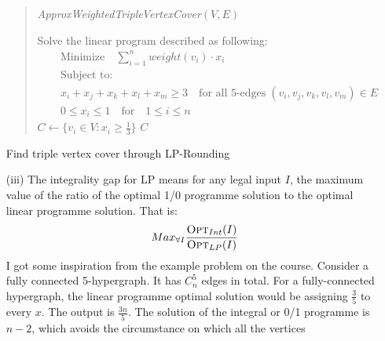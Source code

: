 \documentclass{article}
\renewcommand{\leq}{\leqslant}
\renewcommand{\geq}{\geqslant}
\newcounter{rcounter}
\newenvironment{rlist}%
{\begin{list}{\setnr-\arabic{rcounter}}{\usecounter{rcounter}}}{\end{list}}
\begin{document}
\begin{rlist}
\begin{enumerate}
            \begin{algorithm}
                \vspace*{2mm}
                \begin{quotation}
                    \noindent
                    \emph{ApproxWeightedTripleVertexCover}$(V,E)$
                    \begin{algorithmic}[1]
                        \State Solve the linear program described as following:
                        \begin{eqnarray*}
                            && \textrm{Minimize} \quad \sum_{i=1}^{n}weight(v_i) \cdot x_i \\
                            &&\textrm{Subject to:}\\
                            && x_i+x_j+x_k+x_l+x_m \geq 3 \quad \textrm{for all 5-edges} \; (v_i, v_j, v_k, v_l, v_m) \in  E\\
                            && 0 \leq x_i \leq 1 \quad \textrm{for} \quad 1\leq i \leq n
                        \end{eqnarray*}
                        \State $C \gets \{v_i \in V: x_i \geq \frac{1}{3} \}$
                        \State \Return $C$
                    \end{algorithmic}
                \end{quotation}
                \caption{Find triple vertex cover through LP-Rounding}
            \end{algorithm}
            \item[(iii)] The integrality gap for LP means for any legal input $I$, the maximum value of the ratio of the optimal 1/0 programme
            solution to the optimal linear programme solution. That is:
            $$Max_{\forall{I}} \frac{\textrm{\sc Opt}_{Int}(I)}{\textrm{\sc Opt}_{LP}(I)}$$
            I got some inspiration from the example problem on the course. Consider a fully connected 5-hypergraph. It has $C_{n}^{5}$ edges in total.
            For a fully-connected hypergraph, the linear programme optimal solution would be assigning $\frac{3}{5}$ to every $x$. The output is 
            $\frac{3n}{5}$. The solution of the integral or 0/1 programme is $n-2$, which avoids the circumstance on which all the vertices

\end{enumerate}
\end{rlist}
\end{document}
